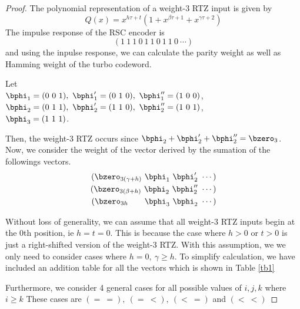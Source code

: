 \documentclass[11pt, oneside, dvipdfmx]{book}
\begin{document}
\begin{proof}
The polynomial representation of a weight-$3$ RTZ input is given by $$Q(x) =x^{h\tau+t}(1+x^{\beta \tau +1}+x^{\gamma \tau +2})$$
The impulse response of the RSC encoder is
\[
(1~1~1~0~1~1~0~1~1~0~\cdots)
\]
and using the inpulse response, we can calculate the parity weight as well as Hamming weight of the turbo codeword. 

Let \\$\bphi_1=(0~0~1),~\bphi'_1=(0~1~0),~\bphi''_1=(1~0~0)$, \\
$\bphi_2=(0~1~1),~\bphi'_2=(1~1~0),~\bphi''_2=(1~0~1)$, \\
$\bphi_3=(1~1~1)$. 

Then, the weight-3 RTZ occurs since $\bphi_2+\bphi'_2+\bphi''_2=\bzero_3$. 
Now, we consider the weight of the vector derived by the sumation of the followings vectors.
\begin{eqnarray*}
(\bzero_{3(\gamma+h)}~\bphi_1~\bphi'_2~\cdots)\cr
(\bzero_{3(\beta+h)}~\bphi_2~\bphi''_2~\cdots)\cr
(\bzero_{3 h}~~~~~~\bphi_3~\bphi_2~\cdots)
\end{eqnarray*}

Without loss of generality, we can assume that all weight-$3$ RTZ inputs begin at the $0$th position, ie $h=t=0$. This is because the case where $h>0$ or $t>0$ is just a right-shifted version of the weight-$3$ RTZ. With this assumption, we we only need to consider cases where $h= 0,~\gamma \geq h$.
To simplify calculation, we have included an addition table for all the vectors which is shown in Table \ref{tb1}

\begin{table}[h!]
\centering
{}
\caption{Truth Table}
\label{tb1}
\end{table}
Furthermore, we consider 4 general cases for all possible values of $i,j,k$ where $i \geq k$ These cases are $(=~=),~(=~<),~(<~=)$ and $(<~<)$

\end{proof}
\end{document}
